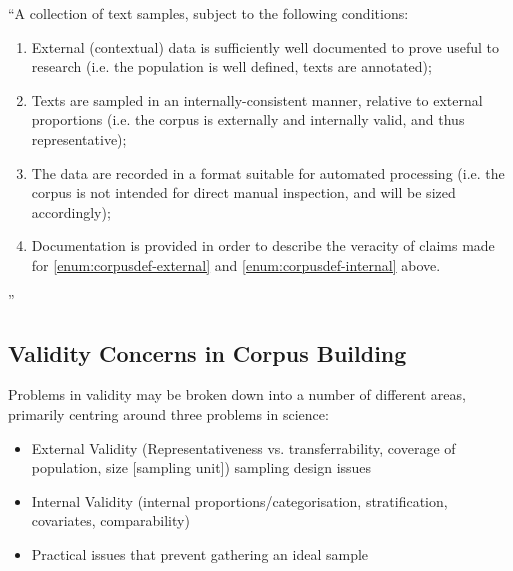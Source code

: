 ``A collection of text samples, subject to the following conditions:

\begin{enumerate}
    \item \label{enum:corpusdef-external} External (contextual) data is sufficiently well documented to prove useful to research (i.e. the population is well defined, texts are annotated);
    \item \label{enum:corpusdef-internal} Texts are sampled in an internally-consistent manner, relative to external proportions (i.e. the corpus is externally and internally valid, and thus representative);
    \item The data are recorded in a format suitable for automated processing (i.e. the corpus is not intended for direct manual inspection, and will be sized accordingly);
    \item Documentation is provided in order to describe the veracity of claims made for \ref{enum:corpusdef-external} and \ref{enum:corpusdef-internal} above.
\end{enumerate}

''


\subsection{Validity Concerns in Corpus Building}



Problems in validity may be broken down into a number of different areas, primarily centring around three problems in science:

\begin{itemize}
    \item External Validity (Representativeness vs. transferrability, coverage of population, size [sampling unit]) sampling design issues
    \item Internal Validity (internal proportions/categorisation, stratification, covariates, comparability)
    \item Practical issues that prevent gathering an ideal sample
\end{itemize}




